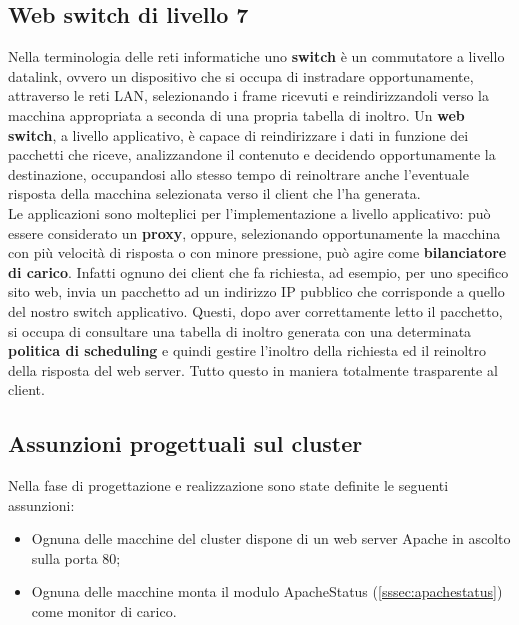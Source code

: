 \documentclass[italian]{tktltiki2}
\begin{document}
\subsection{Web switch di livello 7}
Nella terminologia delle reti informatiche uno \textbf{switch} è un commutatore a livello datalink, ovvero un dispositivo che si occupa di instradare opportunamente, attraverso le reti LAN, selezionando i frame ricevuti e reindirizzandoli verso la macchina appropriata a seconda di una propria tabella di inoltro. Un \textbf{web switch}, a livello applicativo, è capace di reindirizzare i dati in funzione dei pacchetti che riceve, analizzandone il contenuto e decidendo opportunamente la destinazione, occupandosi allo stesso tempo di reinoltrare anche l'eventuale risposta della macchina selezionata verso il client che l'ha generata.
\\
Le applicazioni sono molteplici per l'implementazione a livello applicativo: può essere considerato un \textbf{proxy}, oppure, selezionando opportunamente la macchina con più velocità di risposta o con minore pressione, può agire come \textbf{bilanciatore di carico}. Infatti ognuno dei client che fa richiesta, ad esempio, per uno specifico sito web, invia un pacchetto ad un indirizzo IP pubblico che corrisponde a quello del nostro switch applicativo. Questi, dopo aver correttamente letto il pacchetto, si occupa di consultare una tabella di inoltro generata con una determinata \textbf{politica di scheduling} e quindi gestire l'inoltro della richiesta ed il reinoltro della risposta del web server. Tutto questo in maniera totalmente trasparente al client.

\subsection{Assunzioni progettuali sul cluster}
Nella fase di progettazione e realizzazione sono state definite le seguenti assunzioni:
\begin{itemize}
  \item Ognuna delle macchine del cluster dispone di un web server Apache\cite{apache_server} in ascolto sulla porta 80;
  \item Ognuna delle macchine monta il modulo ApacheStatus (\ref{sssec:apachestatus}) come monitor di carico.
\end{itemize}
\end{document}
